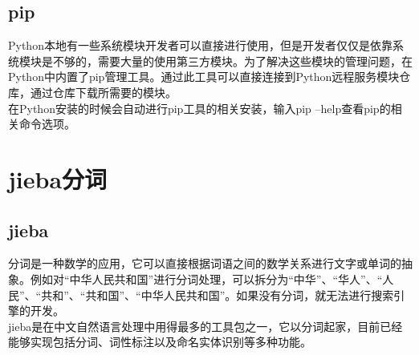\subsection{pip}

Python本地有一些系统模块开发者可以直接进行使用，但是开发者仅仅是依靠系统模块是不够的，需要大量的使用第三方模块。为了解决这些模块的管理问题，在Python中内置了pip管理工具。通过此工具可以直接连接到Python远程服务模块仓库，通过仓库下载所需要的模块。\\

在Python安装的时候会自动进行pip工具的相关安装，输入pip --help查看pip的相关命令选项。

\begin{table}[H]
	\centering
	\caption{pip命令}
\end{table}

\newpage

\section{jieba分词}

\subsection{jieba}

分词是一种数学的应用，它可以直接根据词语之间的数学关系进行文字或单词的抽象。例如对“中华人民共和国”进行分词处理，可以拆分为“中华”、“华人”、“人民”、“共和”、“共和国”、“中华人民共和国”。如果没有分词，就无法进行搜索引擎的开发。\\

jieba是在中文自然语言处理中用得最多的工具包之一，它以分词起家，目前已经能够实现包括分词、词性标注以及命名实体识别等多种功能。\\


